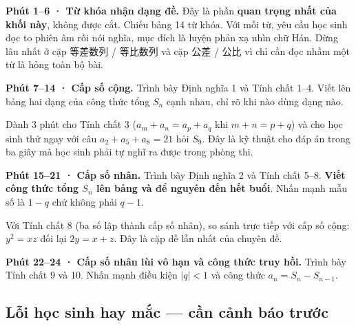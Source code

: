 \documentclass[11pt, a4paper]{article}
\begin{document}
\textbf{Phút 1–6 · Từ khóa nhận dạng đề.} Đây là phần \textbf{quan trọng nhất của khối này}, không được cắt. Chiếu bảng 14 từ khóa. Với mỗi từ, yêu cầu học sinh đọc to phiên âm rồi nói nghĩa, mục đích là luyện phản xạ nhìn chữ Hán. Dừng lâu nhất ở cặp 等差数列 / 等比数列 và cặp 公差 / 公比 vì chỉ cần đọc nhầm một từ là hỏng toàn bộ bài.

\textbf{Phút 7–14 · Cấp số cộng.} Trình bày Định nghĩa 1 và Tính chất 1–4. Viết lên bảng hai dạng của công thức tổng $S_n$ cạnh nhau, chỉ rõ khi nào dùng dạng nào.

Dành 3 phút cho Tính chất 3 ($a_m + a_n = a_p + a_q$ khi $m+n = p+q$) và cho học sinh thử ngay với câu $a_2 + a_5 + a_8 = 21$ hỏi $S_9$. Đây là kỹ thuật cho đáp án trong ba giây mà học sinh phải tự nghĩ ra được trong phòng thi.

\textbf{Phút 15–21 · Cấp số nhân.} Trình bày Định nghĩa 2 và Tính chất 5–8. \textbf{Viết công thức tổng $S_n$ lên bảng và để nguyên đến hết buổi}. Nhấn mạnh mẫu số là $1 - q$ chứ không phải $q - 1$.

Với Tính chất 8 (ba số lập thành cấp số nhân), so sánh trực tiếp với cấp số cộng: $y^2 = xz$ đối lại $2y = x + z$. Đây là cặp dễ lẫn nhất của chuyên đề.

\textbf{Phút 22–24 · Cấp số nhân lùi vô hạn và công thức truy hồi.} Trình bày Tính chất 9 và 10. Nhấn mạnh điều kiện $\lvert q \rvert < 1$ và công thức $a_n = S_n - S_{n-1}$.

\subsection{Lỗi học sinh hay mắc — cần cảnh báo trước}

\end{document}
